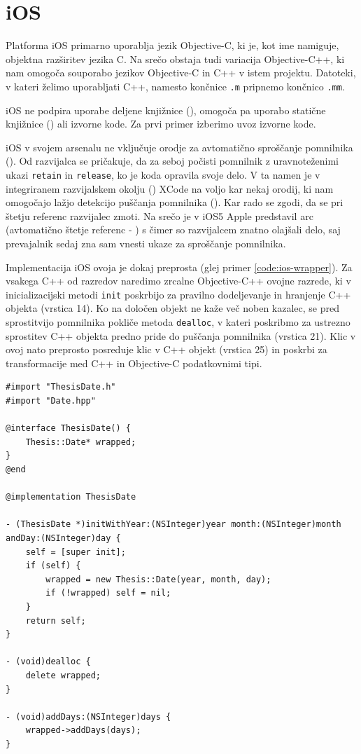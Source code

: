 \section{iOS}

Platforma iOS primarno uporablja jezik Objective-C, ki je, kot ime namiguje, objektna razširitev jezika C. Na srečo obstaja tudi variacija Objective-C++, ki nam omogoča souporabo jezikov Objective-C in C++ v istem projektu. Datoteki, v kateri želimo uporabljati C++, namesto končnice \texttt{.m} pripnemo končnico \texttt{.mm}.

iOS ne podpira uporabe deljene knjižnice (), omogoča pa uporabo statične knjižnice () ali izvorne kode. Za prvi primer izberimo uvoz izvorne kode.

iOS v svojem arsenalu ne vključuje orodje za avtomatično sproščanje pomnilnika (). Od razvijalca se pričakuje, da za seboj počisti pomnilnik z uravnoteženimi ukazi \texttt{retain} in \texttt{release}, ko je koda opravila svoje delo. V ta namen je v integriranem razvijalskem okolju () XCode na voljo kar nekaj orodij, ki nam omogočajo lažjo detekcijo puščanja pomnilnika (). Kar rado se zgodi, da se pri štetju referenc razvijalec zmoti. Na srečo je v iOS5 Apple predstavil \gls{arc} (avtomatično štetje referenc - ) s čimer so razvijalcem znatno olajšali delo, saj prevajalnik sedaj zna sam vnesti ukaze za sproščanje pomnilnika.

Implementacija iOS ovoja je dokaj preprosta (glej primer \ref{code:ios-wrapper}). Za vsakega C++ od razredov naredimo zrcalne Objective-C++ ovojne razrede, ki v inicializacijski metodi \texttt{init} poskrbijo za pravilno dodeljevanje in hranjenje C++ objekta (vrstica 14). Ko na določen objekt ne kaže več noben kazalec, se pred sprostitvijo pomnilnika pokliče metoda \texttt{dealloc}, v kateri poskribmo za ustrezno sprostitev C++ objekta predno pride do puščanja pomnilnika (vrstica 21). Klic v ovoj nato preprosto posreduje klic v C++ objekt (vrstica 25) in poskrbi za transformacije med C++ in Objective-C podatkovnimi tipi.

\lstset{language=[Objective]C, breaklines}
\begin{lstlisting}[caption={Primer Objective-C++ ovoja C++ razreda \texttt{Date}.}, label=code:ios-wrapper]
#import "ThesisDate.h"
#import "Date.hpp"

@interface ThesisDate() {
    Thesis::Date* wrapped;
}
@end

@implementation ThesisDate

- (ThesisDate *)initWithYear:(NSInteger)year month:(NSInteger)month andDay:(NSInteger)day {
    self = [super init];
    if (self) {
        wrapped = new Thesis::Date(year, month, day);
        if (!wrapped) self = nil;
    }
    return self;
}

- (void)dealloc {
    delete wrapped;
}

- (void)addDays:(NSInteger)days {
    wrapped->addDays(days);
}
\end{lstlisting}

